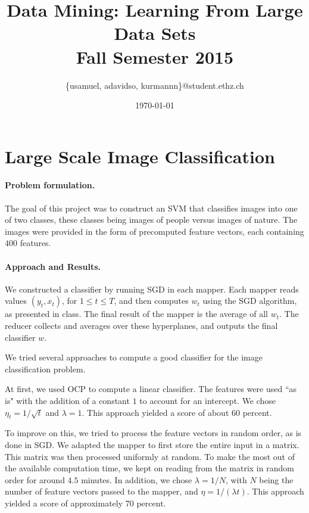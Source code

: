 \documentclass[a4paper, 11pt]{article}
\title{Data Mining: Learning From Large Data Sets\\\vspace{2mm}\Large{Fall Semester 2015}}
\author{\{usamuel, adavidso, kurmannn\}@student.ethz.ch}
\date{\today}
\begin{document}
\maketitle
\thispagestyle{empty}
\pagestyle{empty}

\section*{Large Scale Image Classification} 


\paragraph{Problem formulation.\!\!\!}
The goal of this project was to construct an SVM that classifies images into one of two classes, these classes being images of people versus images of nature. The images were provided in the form of precomputed feature vectors, each containing $400$ features.

\paragraph{Approach and Results.\!\!\!}
We constructed a classifier by running SGD in each mapper. Each mapper reads values $(y_t,x_t)$, for $1\leq t\leq T$, and then computes $w_t$ using the SGD algorithm, as presented in class. The final result of the mapper is the average of
all $w_t$. The reducer collects and averages over these hyperplanes, and outputs the final classifier $w$.

We tried several approaches to compute a good classifier for the image classification problem.

At first, we used OCP to compute a linear classifier. The features were used ``as is" with the addition of a constant $1$ to account for an intercept. We chose $\eta_t=1/\sqrt{t}$ and $\lambda=1$. This approach yielded a score of about $60$ percent.

To improve on this, we tried to process the feature vectors in random order, as is done in SGD. We adapted the mapper to first store the entire input in a matrix. This matrix was then processed uniformly at random. To make the most out of the available computation time, we kept on reading from the matrix in random order for around $4.5$ minutes. In addition, we chose $\lambda=1/N$, with $N$ being the number of feature vectors passed to the mapper, and $\eta= 1/(\lambda t)$. 
This approach yielded a score of approximately 70 percent.
\end{document}
